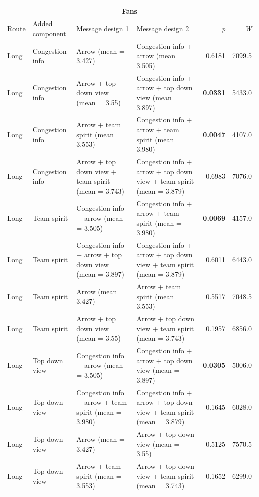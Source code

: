 \begin{table}
\begin{scriptsize}
\hspace{-3.0cm}
\begin{tabular}{llllrr}
\multicolumn{6}{c}{\textbf{Fans}} \\
\hline
 Route & Added component & Message design 1 & Message design 2 & \textit{p} &  \textit{W} \\ 
  \hline
Long & Congestion info & Arrow (mean = 3.427) & Congestion info + arrow (mean = 3.505) & 0.6181 & 7099.5 \\
  Long & Congestion info & Arrow + top down view (mean = 3.55) & Congestion info + arrow + top down view (mean = 3.897) & \textbf{0.0331} & 5433.0 \\
  Long & Congestion info & Arrow + team spirit (mean = 3.553) & Congestion info + arrow + team spirit (mean = 3.980) & \textbf{0.0047} & 4107.0 \\
  Long & Congestion info & Arrow + top down view + team spirit (mean = 3.743) & Congestion info + arrow + top down view + team spirit (mean = 3.879) & 0.6983 & 7076.0 \\
  Long & Team spirit & Congestion info + arrow (mean = 3.505) & Congestion info + arrow + team spirit (mean = 3.980) & \textbf{0.0069} & 4157.0 \\
  Long & Team spirit & Congestion info + arrow + top down view (mean = 3.897) & Congestion info + arrow + top down view + team spirit (mean = 3.879) & 0.6011 & 6443.0 \\
  Long & Team spirit & Arrow (mean = 3.427) & Arrow + team spirit (mean = 3.553) & 0.5517 & 7048.5 \\
  Long & Team spirit & Arrow + top down view (mean = 3.55) & Arrow + top down view + team spirit (mean = 3.743) & 0.1957 & 6856.0 \\
  Long & Top down view & Congestion info + arrow (mean = 3.505) & Congestion info + arrow + top down view (mean = 3.897) & \textbf{0.0305} & 5006.0 \\
  Long & Top down view & Congestion info + arrow + team spirit (mean = 3.980) & Congestion info + arrow + top down view + team spirit (mean = 3.879) & 0.1645 & 6028.0 \\
  Long & Top down view & Arrow (mean = 3.427) & Arrow + top down view (mean = 3.55) & 0.5125 & 7570.5 \\
  Long & Top down view & Arrow + team spirit (mean = 3.553) & Arrow + top down view + team spirit (mean = 3.743) & 0.1652 & 6299.0 \\

\end{tabular}
\end{scriptsize}
\end{table}
